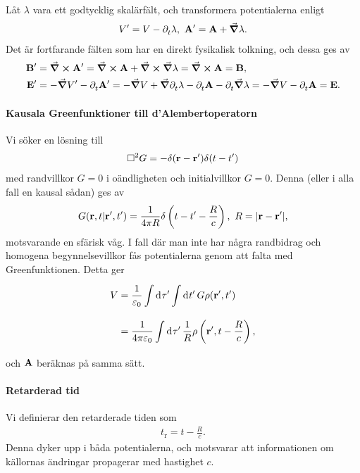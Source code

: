 Låt $\lambda$ vara ett godtycklig skalärfält, och transformera potentialerna enligt
\begin{align*}
	V' = V - \partial_{t}^{}\lambda,\ \vb{A}' = \vb{A} + \grad{\lambda}.
\end{align*}
Det är fortfarande fälten som har en direkt fysikalisk tolkning, och dessa ges av
\begin{align*}
	\vb{B}' &= \curl{\vb{A}'} = \curl{\vb{A}} + \curl{\grad{\lambda}} = \curl{\vb{A}} = \vb{B}, \\
	\vb{E}' &= -\grad{V'} - \partial_{t}^{}\vb{A}' = -\grad{V} + \grad{\partial_{t}^{}\lambda} - \partial_{t}^{}\vb{A} - \partial_{t}^{}\grad{\lambda} = -\grad{V} - \partial_{t}^{}\vb{A} = \vb{E}.
\end{align*}

\paragraph{Kausala Greenfunktioner till d'Alembertoperatorn}
Vi söker en lösning till
\begin{align*}
	\Box^{2}{G} = -\delta(\vb{r} - \vb{r}')\delta(t - t')
\end{align*}
med randvillkor $G = 0$ i oändligheten och initialvillkor $G = 0$. Denna (eller i alla fall en kausal sådan) ges av
\begin{align*}
	G(\vb{r}, t | \vb{r}', t') = \frac{1}{4\pi R}\delta\left(t - t' - \frac{R}{c}\right),\ R = \abs{\vb{r} - \vb{r}'},
\end{align*}
motsvarande en sfärisk våg. I fall där man inte har några randbidrag och homogena begynnelsevillkor fås potentialerna genom att falta med Greenfunktionen. Detta ger
\begin{align*}
	V &= \frac{1}{\varepsilon_{0}}\int\limits_{}^{}\dd[]{\tau'}\int\limits_{}^{}\dd[]{t'}G\rho(\vb{r}', t') \\
	  &= \frac{1}{4\pi\varepsilon_{0}}\int\limits_{}^{}\dd[]{\tau'}\frac{1}{R}\rho\left(\vb{r}', t - \frac{R}{c}\right),
\end{align*}
och $\vb{A}$ beräknas på samma sätt.

\paragraph{Retarderad tid}
Vi definierar den retarderade tiden som
\begin{align*}
	t_{\text{r}} = t - \frac{R}{c}.
\end{align*}
Denna dyker upp i båda potentialerna, och motsvarar att informationen om källornas ändringar propagerar med hastighet $c$.

